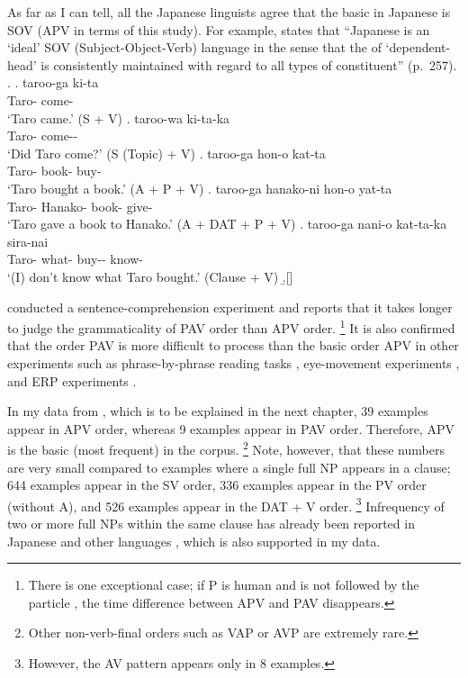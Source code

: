 As far as I can tell,
all the Japanese linguists agree that
the basic  in Japanese is SOV (APV in terms of this study).
For example,
 states that
``Japanese is an `ideal' SOV (Subject-Object-Verb) language
in the sense that the  of `dependent-head' is consistently maintained with regard to all types of constituent'' (p.~257).
%
\ex.
 \ag. taroo-ga ki-ta \\
      Taro- come- \\
      `Taro came.' \hfill{(S + V)}
 \bg. taroo-wa ki-ta-ka \\
      Taro- come-- \\
      `Did Taro come?'  \hfill{(S (Topic) + V)}
 \bg. taroo-ga hon-o kat-ta \\
      Taro- book- buy- \\
      `Taro bought a book.' \hfill{(A + P + V)}
 \bg. taroo-ga hanako-ni hon-o yat-ta \\
      Taro- Hanako- book- give- \\
      `Taro gave a book to Hanako.' \hfill{(A + DAT + P + V)}
 \bg. taroo-ga nani-o kat-ta-ka sira-nai \\
      Taro- what- buy-- know- \\
      `(I) don't know what Taro bought.'  \hfill{(Clause + V)}
 \b.[]     \hfill{\cite[257--258]{shibatani90}}


 conducted a sentence-comprehension experiment and
reports that it takes longer to judge the grammaticality of PAV order than APV order.%
 \footnote{
 There is one exceptional case;
 if P is human and is not followed by the particle ,
 the time difference between APV and PAV disappears.
 }
It is also confirmed that
the order PAV is more difficult to process than the basic order APV
in other experiments such as
phrase-by-phrase reading tasks \cite{miyamototakahashi02},
eye-movement experiments \cite{mazukaetal02}, and
ERP experiments \cite{uenokluender03}.

In my data from ,
which is to be explained in the next chapter,
39 examples appear in APV order,
whereas 9 examples appear in PAV order.
Therefore, APV is the basic (most frequent)  in the corpus.%
 \footnote{
 Other non-verb-final orders such as VAP or AVP are extremely rare.
 }
Note, however, that
these numbers are very small compared to
examples where a single full NP appears in a clause;
644 examples appear in the SV order,
336 examples appear in the PV order (without A), and
526 examples appear in the DAT + V order.%
 \footnote{
 However, the AV pattern appears only in 8 examples.
 }
Infrequency of two or more full NPs within the same clause
has already been reported in Japanese \cite{matsumoto03} and other languages \cite{dubois87,dryer97},
which is also supported in my data.


